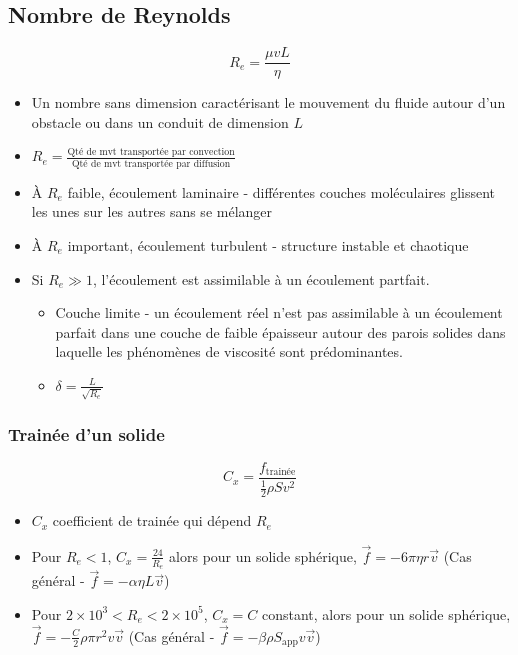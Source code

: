 \documentclass[openany]{book}
\begin{document}
\subsection{Nombre de Reynolds}

\[ R_e = \frac{\mu v L}{\eta} \]

\begin{itemize}
    \item Un nombre sans dimension caractérisant le mouvement du fluide autour d'un obstacle ou dans un conduit de dimension $L$
    \item $R_e = \frac{\text{Qté de mvt transportée par convection}}{\text{Qté de mvt transportée par diffusion}}$
    \item À $R_e$ faible, écoulement laminaire - différentes couches moléculaires glissent les unes sur les autres sans se mélanger
    \item À $R_e$ important, écoulement turbulent - structure instable et chaotique
    \item Si $R_e \gg 1$, l'écoulement est assimilable à un écoulement partfait.
    \begin{itemize}
        \item Couche limite - un écoulement réel n'est pas assimilable à un écoulement parfait dans une couche de faible épaisseur autour des parois solides dans laquelle les phénomènes de viscosité sont prédominantes.
        \item $\delta = \frac{L}{\sqrt{R_e}}$
    \end{itemize}
\end{itemize}

\subsubsection{Trainée d'un solide}
\[ C_x = \frac{f_{\text{trainée}}}{\frac{1}{2}\rho S v^2} \]

\begin{itemize}
    \item $C_x$ coefficient de trainée qui dépend $R_e$
    \item Pour $R_e < 1$, $C_x = \frac{24}{R_e}$ alors pour un solide sphérique, $\vec{f} = -6\pi \eta r \vec{v}$ (Cas général - $\vec{f} = - \alpha \eta L \vec{v}$)
    \item Pour $2\times10^3 < R_e < 2\times10^5$, $C_x = C$ constant, alors pour un solide sphérique, $\vec{f} = - \frac{C}{2}\rho \pi r^2 v \vec{v}$ (Cas général - $\vec{f} = - \beta \rho S_{\text{app}} v\vec{v}$)
\end{itemize}
\end{document}
